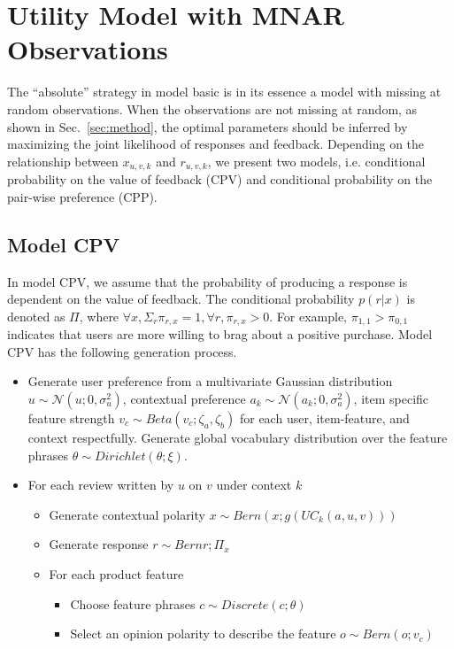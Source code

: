\documentclass[sigconf]{acmart}
\begin{document}
\section{Utility Model with MNAR Observations}\label{sec:mnar}
The ``absolute'' strategy in model basic is in its essence a model with missing at random observations. When the observations are not missing at random, as shown in Sec.~\ref{sec:method},  the optimal parameters should be inferred by maximizing the joint likelihood of responses and feedback. Depending on the relationship between $x_{u,v,k}$ and $r_{u,v,k}$, we present two models, i.e. conditional probability on the value of feedback (CPV) and conditional probability on the pair-wise preference (CPP).

\subsection{Model CPV}
In model CPV, we assume that the probability of producing a response is dependent on the value of feedback. The conditional probability $p(r|x)$ is denoted as $\Pi$, where $\forall x, \Sigma_r \pi_{r,x}=1, \forall r, \pi_{r,x}>0$. For example, $\pi_{1,1}>\pi_{0,1}$ indicates that users are more willing to brag about a positive purchase. Model CPV has the following generation process.
\begin{itemize}
	\item Generate user preference from a multivariate Gaussian distribution $u\sim \mathcal{N}(u;0,\sigma_u^2)$, contextual preference $a_k\sim \mathcal{N}(a_k;0,\sigma_a^2)$, item specific feature strength $v_c \sim Beta(v_c;\zeta_a,\zeta_b)$ for each user, item-feature, and context respectfully. Generate global vocabulary distribution over the feature phrases $\theta\sim Dirichlet(\theta;\xi)$.
	\item For each review written by $u$ on $v$ under context $k$
	\begin{itemize}
	\item Generate contextual polarity $x\sim Bern(x;g(UC_k(a,u,v)))$
	\item Generate response $r \sim Bern{r;\Pi_x}$
	\item For each product feature
	\begin{itemize}
	\item Choose feature phrases $c\sim Discrete(c;\theta)$
	\item Select an opinion polarity to describe the feature $o \sim Bern(o;v_c)$
	\end{itemize}
	\end{itemize}
\end{itemize}
\end{document}
